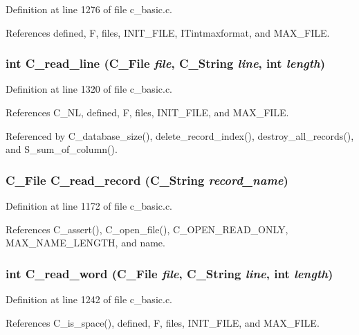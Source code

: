 Definition at line 1276 of file c\_\-basic.c.

References defined, F, files, INIT\_\-FILE, ITintmaxformat, and MAX\_\-FILE.
\subsubsection{\setlength{\rightskip}{0pt plus 5cm}int C\_\-read\_\-line (\bf{C\_\-File} {\em file}, \bf{C\_\-String} {\em line}, int {\em length})}\label{c__basic_8c_1a6df81884446dd41e688bd638ef3755}




Definition at line 1320 of file c\_\-basic.c.

References C\_\-NL, defined, F, files, INIT\_\-FILE, and MAX\_\-FILE.

Referenced by C\_\-database\_\-size(), delete\_\-record\_\-index(), destroy\_\-all\_\-records(), and S\_\-sum\_\-of\_\-column().
\subsubsection{\setlength{\rightskip}{0pt plus 5cm}\bf{C\_\-File} C\_\-read\_\-record (\bf{C\_\-String} {\em record\_\-name})}\label{c__basic_8c_8f9ff98d0906472b6980c8b83905b7e9}




Definition at line 1172 of file c\_\-basic.c.

References C\_\-assert(), C\_\-open\_\-file(), C\_\-OPEN\_\-READ\_\-ONLY, MAX\_\-NAME\_\-LENGTH, and name.
\subsubsection{\setlength{\rightskip}{0pt plus 5cm}int C\_\-read\_\-word (\bf{C\_\-File} {\em file}, \bf{C\_\-String} {\em line}, int {\em length})}\label{c__basic_8c_f146bfd3866a4f5a63d97711a8bf08d2}




Definition at line 1242 of file c\_\-basic.c.

References C\_\-is\_\-space(), defined, F, files, INIT\_\-FILE, and MAX\_\-FILE.
